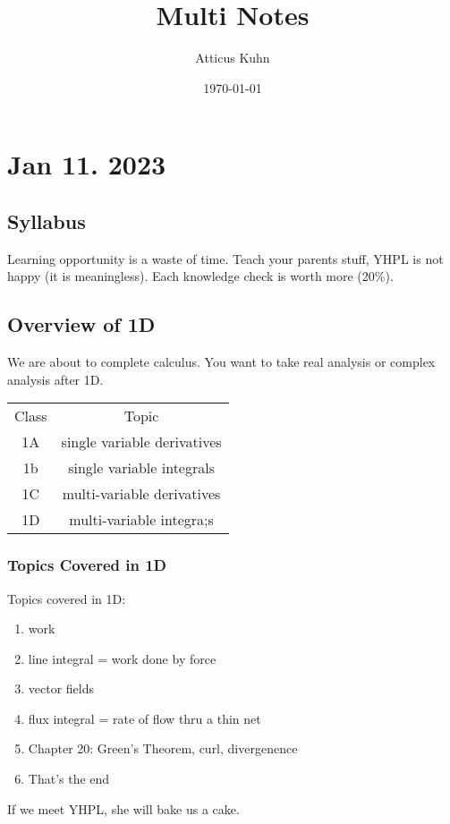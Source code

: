 \documentclass[11pt]{article}
\title{Multi Notes}
\author{Atticus Kuhn}
\date{\today}
\begin{document}
\maketitle
\tableofcontents



\section{Jan 11. 2023}
\subsection{Syllabus}
Learning opportunity is a waste of time.
Teach your parents stuff, YHPL is not happy (it is meaningless).
Each knowledge check is worth more (20\%).
\subsection{Overview of 1D}
We are about to complete calculus.
You want to take real analysis or complex analysis after 1D.
\begin{table}[h]
  \centering
  \begin{tabular}{c|c}
    Class & Topic \\
    1A & single variable derivatives \\
    1b & single variable integrals \\
    1C & multi-variable derivatives \\
    1D & multi-variable integra;s \\
    \end{tabular}
  \end{table}



\subsubsection{Topics Covered in 1D}
Topics covered in 1D:
\begin{enumerate}
  \item work
\item line integral = work done by force
  \item vector fields
\item flux integral = rate of flow thru a thin net
  \item Chapter 20: Green's Theorem, curl, divergenence
    \item That's the end
\end{enumerate}
If we meet YHPL, she will bake us a cake.
\end{document}
